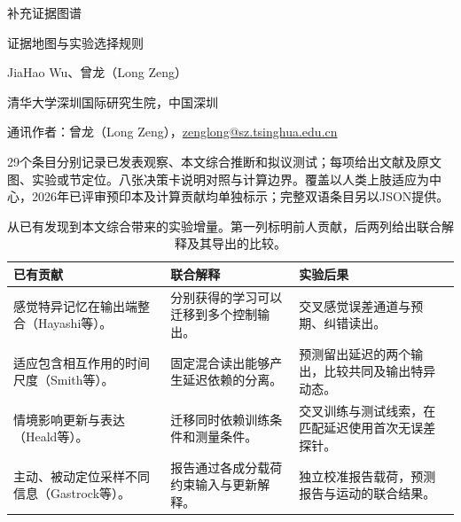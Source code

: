 \documentclass[11pt,a4paper]{article}
\begin{document}
{\small\sffamily\color{navy} 补充证据图谱}\par\medskip
{\LARGE\bfseries\raggedright 证据地图与实验选择规则\par}\bigskip
{\normalsize JiaHao Wu、曾龙（Long Zeng）\par}
{\small 清华大学深圳国际研究生院，中国深圳\par}\medskip
{}
{\small 通讯作者：曾龙（Long Zeng），\href{mailto:zenglong@sz.tsinghua.edu.cn}{zenglong@sz.tsinghua.edu.cn}\par}\medskip
29个条目分别记录已发表观察、本文综合推断和拟议测试；每项给出文献及原文图、实验或节定位。八张决策卡说明对照与计算边界。覆盖以人类上肢适应为中心，2026年已评审预印本及计算贡献均单独标示；完整双语条目另以JSON提供。
\begin{table}[!htbp]\small\caption{从已有发现到本文综合带来的实验增量。第一列标明前人贡献，后两列给出联合解释及其导出的比较。}\label{tab:synthesis}
\begin{tabularx}{\textwidth}{>{\raggedright\arraybackslash}X>{\raggedright\arraybackslash}X>{\raggedright\arraybackslash}X}\toprule
\textbf{已有贡献} & \textbf{联合解释} & \textbf{实验后果}\\\midrule
感觉特异记忆在输出端整合（Hayashi等）。 & 分别获得的学习可以迁移到多个控制输出。 & 交叉感觉误差通道与预期、纠错读出。\\[6pt]
适应包含相互作用的时间尺度（Smith等）。 & 固定混合读出能够产生延迟依赖的分离。 & 预测留出延迟的两个输出，比较共同及输出特异动态。\\[6pt]
情境影响更新与表达（Heald等）。 & 迁移同时依赖训练条件和测量条件。 & 交叉训练与测试线索，在匹配延迟使用首次无误差探针。\\[6pt]
主动、被动定位采样不同信息（Gastrock等）。 & 报告通过各成分载荷约束输入与更新解释。 & 独立校准报告载荷，预测报告与运动的联合结果。\\[6pt]
\bottomrule\end{tabularx}\end{table}
\end{document}
